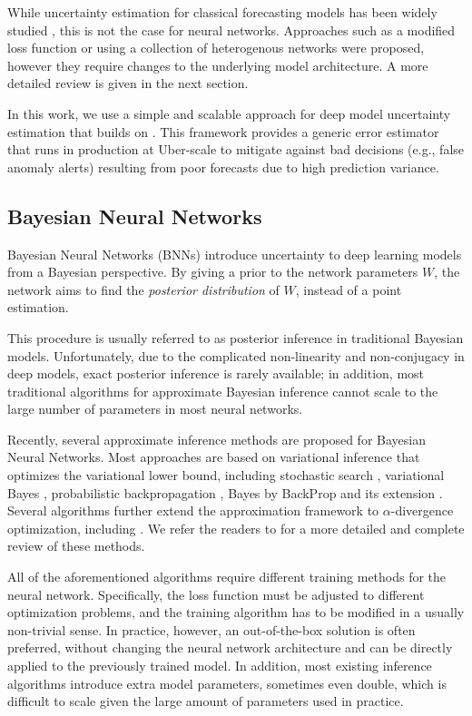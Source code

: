 \documentclass[conference,compsoc,final]{IEEEtran}
\begin{document}
While uncertainty estimation for classical forecasting models has been widely studied \cite{622683}, this is not the case for neural networks. Approaches such as a modified loss function or using a collection of heterogenous networks \cite{gal2017concrete} were proposed, however they require changes to the underlying model architecture. A more detailed review is given in the next section. 

In this work, we use a simple and scalable approach for deep model uncertainty estimation that builds on \cite{gal2016dropout}. This framework provides a generic error estimator that runs in production 
at Uber-scale
to mitigate against bad decisions (e.g., false anomaly alerts) 
resulting from poor forecasts due to high prediction variance. 

\subsection{Bayesian Neural Networks}
\label{sec:bnn}
Bayesian Neural Networks (BNNs) introduce uncertainty to deep learning models from a Bayesian perspective. By giving a prior to the network parameters $W$,  the network aims to find the {\it posterior distribution} of $W$, instead of a point estimation.

This procedure is usually referred to as posterior inference in traditional Bayesian models. Unfortunately, due to the complicated non-linearity and non-conjugacy in deep models, exact posterior inference is rarely available; in addition, most traditional algorithms for approximate Bayesian inference cannot scale to the large number of parameters in most neural networks.

Recently, several approximate inference methods are proposed for Bayesian Neural Networks. Most approaches are based on variational inference that optimizes the variational lower bound, including stochastic search \cite{paisley2012variational}, variational Bayes \cite{kingma2013auto}, probabilistic backpropagation \cite{hernandez2015probabilistic}, Bayes by BackProp \cite{blundell2015weight} and its extension \cite{fortunato2017bayesian}. Several algorithms further extend the approximation framework to $\alpha$-divergence optimization, including \cite{hernandez2016black, li2017dropout}. We refer the readers to \cite{gal2016uncertainty} for a more detailed and complete review of these methods.

All of the aforementioned algorithms require different training methods for the neural network. Specifically, the loss function must be adjusted to different optimization problems, and the training algorithm has to be modified in a usually non-trivial sense. In practice, however, an out-of-the-box solution is often preferred, without changing the neural network architecture and can be directly applied to the previously trained model. In addition, most existing inference algorithms introduce extra model parameters, sometimes even double, which is difficult to scale given the large amount of parameters used in practice.
\end{document}
